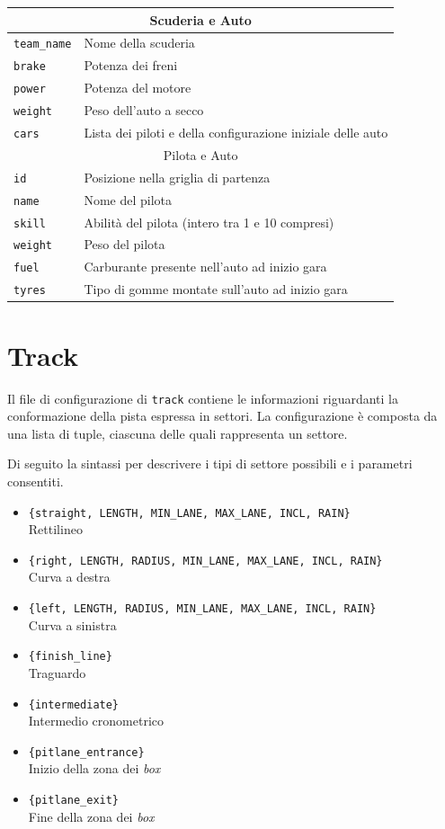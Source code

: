 \documentclass[11pt,a4paper]{report}
\begin{document}
\begin{center}
\begin{tabular}{|p{}|p{}|}
\hline
\multicolumn{2}{|c|}{Scuderia e Auto}\\
\hline
\texttt{team\_name} & Nome della scuderia\\
\texttt{brake} & Potenza dei freni\\
\texttt{power} & Potenza del motore\\
\texttt{weight} & Peso dell'auto a secco\\
\texttt{cars} & Lista dei piloti e della configurazione iniziale delle auto\\
\hline
\multicolumn{2}{|c|}{Pilota e Auto}\\
\hline
\texttt{id} & Posizione nella griglia di partenza\\
\texttt{name} & Nome del pilota\\
\texttt{skill} & Abilità del pilota (intero tra 1 e 10 compresi)\\
\texttt{weight} & Peso del pilota\\
\texttt{fuel} & Carburante presente nell'auto ad inizio gara\\
\texttt{tyres} & Tipo di gomme montate sull'auto ad inizio gara\\
\hline
\end{tabular}
\end{center}

\section*{Track}
Il file di configurazione di \texttt{track} contiene le informazioni riguardanti la conformazione della pista espressa in settori. La configurazione è composta da una lista di tuple, ciascuna delle quali rappresenta un settore.

Di seguito la sintassi per descrivere i tipi di settore possibili e i parametri consentiti.

\begin{itemize}
\item \verb!{straight, LENGTH, MIN_LANE, MAX_LANE, INCL, RAIN}!\\ Rettilineo
\item \verb!{right, LENGTH, RADIUS, MIN_LANE, MAX_LANE, INCL, RAIN}!\\ Curva a destra
\item \verb!{left, LENGTH, RADIUS, MIN_LANE, MAX_LANE, INCL, RAIN}!\\ Curva a sinistra
\item \verb!{finish_line}!\\ Traguardo
\item \verb!{intermediate}!\\ Intermedio cronometrico
\item \verb!{pitlane_entrance}!\\ Inizio della zona dei \textit{box}
\item \verb!{pitlane_exit}!\\ Fine della zona dei \textit{box}
\end{itemize}
\end{document}

